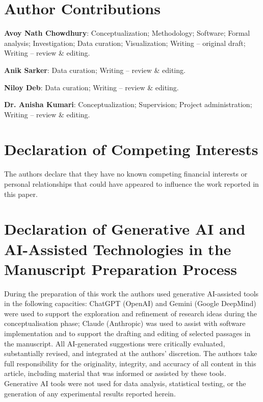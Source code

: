 \documentclass[a4paper,fleqn,longmktitle]{cas-sc}
\begin{document}
	\section*{Author Contributions}

	\noindent\textbf{Avoy Nath Chowdhury}:
	Conceptualization; Methodology; Software; Formal analysis;
	Investigation; Data curation; Visualization;
	Writing -- original draft; Writing -- review \& editing.

	\noindent\textbf{Anik Sarker}:
	Data curation; Writing -- review \& editing.

	\noindent\textbf{Niloy Deb}:
	Data curation; Writing -- review \& editing.

	\noindent\textbf{Dr. Anisha Kumari}:
	Conceptualization; Supervision; Project administration;
	Writing -- review \& editing.
	
	
	
	\section*{Declaration of Competing Interests}
	
	The authors declare that they have no known competing financial
	interests or personal relationships that could have appeared to
	influence the work reported in this paper.
	
	

	\section*{Declaration of Generative AI and AI-Assisted Technologies
		in the Manuscript Preparation Process}

	During the preparation of this work the authors used generative
	AI-assisted tools in the following capacities:
	ChatGPT (OpenAI) and Gemini (Google DeepMind) were used to support
	the exploration and refinement of research ideas during the
	conceptualisation phase;
	Claude (Anthropic) was used to assist with software implementation
	and to support the drafting and editing of selected passages in the
	manuscript.
	All AI-generated suggestions were critically evaluated, substantially
	revised, and integrated at the authors' discretion.
	The authors take full responsibility for the originality, integrity,
	and accuracy of all content in this article, including material
	that was informed or assisted by these tools.
	Generative AI tools were not used for data analysis, statistical
	testing, or the generation of any experimental results reported herein.
	
\end{document}
